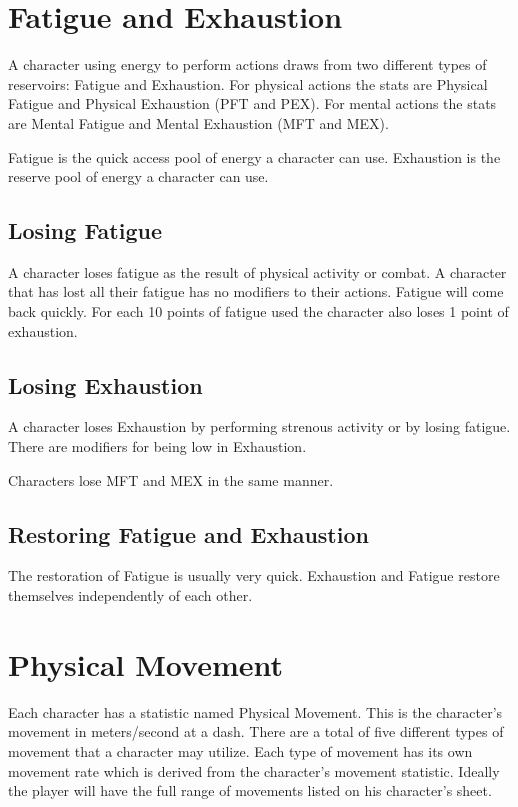\section{Fatigue and Exhaustion}

A character using energy to perform actions draws from two different 
types of reservoirs: Fatigue and Exhaustion. For physical actions the 
stats are Physical Fatigue and Physical Exhaustion (PFT and PEX). For mental
actions the stats are Mental Fatigue and Mental Exhaustion (MFT and MEX).

Fatigue is the quick access pool of energy a character can use.
Exhaustion is the reserve pool of energy a character can use. 

\subsection{Losing Fatigue}

A character loses fatigue as the result of physical activity or combat. 
A character that has lost all their fatigue has no modifiers to their actions.
Fatigue will come back quickly. For each 10 points of fatigue used the character 
also loses 1 point of exhaustion.

\subsection{Losing Exhaustion}
A character loses Exhaustion by performing strenous activity or by losing 
fatigue. There are modifiers for being low in Exhaustion.



Characters lose MFT and MEX in the same manner.



\subsection{Restoring Fatigue and Exhaustion}

The restoration of Fatigue is usually very quick. Exhaustion and Fatigue
restore themselves independently of each other.



\section{Physical Movement}

Each character has a statistic named Physical Movement. This is the character's
movement in meters/second at a dash. There are a total of five different types
of movement that a character may utilize. Each type of movement has its own
movement rate which is derived from the character's movement statistic. 
Ideally the player will have the full range of movements listed on his 
character's sheet. 

